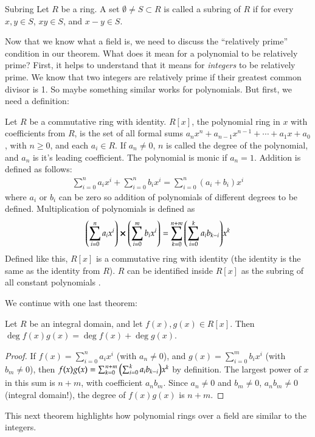 \documentclass[12pt]{article}
\newenvironment{theorem}{\begin{mytheorem}}{\end{mytheorem}}
\theoremstyle{definitionstyle}
\newenvironment{definition}{\begin{mydef}}{\end{mydef}}
\begin{document}
\begin{definition}{Subring}
	Let $R$ be a ring. A set $\emptyset \neq S \subset R$ is called a subring of $R$ if for every $x, y \in S$, $xy \in S$, and $x-y \in S$.
\end{definition}
Now that we know what a field is, we need to discuss the ``relatively prime'' condition in our theorem. What does it mean for a polynomial to be relatively prime? First, it helps to understand that it means for \textit{integers} to be relatively prime. We know that two integers are relatively prime if their greatest common divisor is 1. So maybe something similar works for polynomials. But first, we need a definition:
\begin{definition}
	Let $R$ be a commutative ring with identity. $R[x]$, the polynomial ring in $x$ with coefficients from $R$, is the set of all formal sums $a_nx^n + a_{n-1}x^{n-1} + \cdots + a_1x + a_0$, with $n \geq 0$, and each $a_i \in R$. If $a_n \neq 0$, $n$ is called the degree of the polynomial, and $a_n$ is it's leading coefficient. The polynomial is monic if $a_n = 1$. Addition is defined as follows:
	\begin{align*}
		\sum_{i=0}^{n} a_ix^i + \sum_{i=0}^{n} b_ix^i = \sum_{i=0}^{n} (a_i+b_i)x^i
	\end{align*}
	where $a_i$ or $b_i$ can be zero so addition of polynomials of different degrees to be defined. Multiplication of polynomials is defined as
	\begin{align*}
		\qty(\sum_{i=0}^n a_ix^i) \cross \qty(\sum_{i=0}^m b_ix^i) = \sum_{k=0}^{n+m} \qty(\sum_{i=0}^k a_ib_{k-i})x^k
	\end{align*}
	Defined like this, $R[x]$ is a commutative ring with identity (the identity is the same as the identity from $R$). $R$ can be identified inside $R[x]$ as the subring of all constant polynomials \cite{dummit}.
\end{definition}
We continue with one last theorem:
\begin{theorem}
	Let $R$ be an integral domain, and let $f(x), g(x) \in R[x]$. Then $\deg f(x)g(x) = \deg f(x) + \deg g(x)$.
\end{theorem}
\begin{proof}
	If $f(x) = \sum_{i=0}^{n} a_ix^i$ (with $a_n \neq 0$), and $g(x) = \sum_{i=0}^{m} b_ix^i$ (with $b_m \neq 0$), then $f(x)g(x) = \sum_{k=0}^{n+m} \qty(\sum_{i=0}^k a_ib_{k-i})x^k$ by definition. The largest power of $x$ in this sum is $n+m$, with coefficient $a_nb_m$. Since $a_n \neq 0$ and $b_m \neq 0$, $a_nb_m \neq 0$ (integral domain!), the degree of $f(x)g(x)$ is $n+m$. 
\end{proof}
This next theorem highlights how polynomial rings over a field are similar to the integers.
\end{document}
